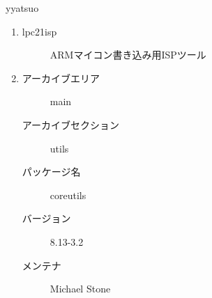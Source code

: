 \documentclass[mingoth,a4paper]{jsarticle}
\begin{document}
\begin{prework}{ yyatsuo }
  \begin{enumerate}
  \item
    \begin{description}
    \item [lpc21isp] ARMマイコン書き込み用ISPツール
    \end{description}
  \item 
    \begin{description}
    \item [アーカイブエリア] main
    \item [アーカイブセクション] utils
    \item [パッケージ名] coreutils
    \item [バージョン] 8.13-3.2
    \item [メンテナ]  Michael Stone 
    \end{description}
  \end{enumerate}
\end{prework}
\end{document}

